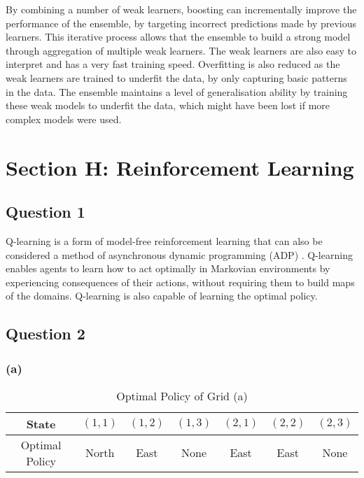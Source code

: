 \documentclass[10pt]{article}
\begin{document}
By combining a number of weak learners, boosting can incrementally improve the performance of
the ensemble, by targeting incorrect predictions made by previous learners. This iterative process
allows that the ensemble to build a strong model through aggregation of multiple weak learners.
The weak learners are also easy to interpret and has a very fast training speed. Overfitting is also
reduced as the weak learners are trained to underfit the data, by only capturing basic patterns in the data.
The ensemble maintains a level of generalisation ability by training these weak models to underfit the data, which
might have been lost if more complex models were used.

\section*{Section H: Reinforcement Learning}

\subsection*{Question 1}

Q-learning is a form of model-free reinforcement learning that can also be considered a method of
asynchronous dynamic programming (ADP) \cite{watkins1989learning}. Q-learning enables agents to
learn how to act optimally in Markovian environments by experiencing consequences of their actions,
without requiring them to build maps of the domains. Q-learning is also capable of learning the
optimal policy.

\subsection*{Question 2}

\subsubsection*{(a)}

\begin{table*}
    \centering
    \caption{Optimal Policy of Grid (a)}
    \begin{tabular}{|c|c|c|c|c|c|c|}
        \hline
        State & $(1,1)$ & $(1,2)$ & $(1,3)$ & $(2,1)$ & $(2,2)$ & $(2,3)$ \\
        \hline
        Optimal Policy & North & East & None & East & East & None \\
        \hline
    \end{tabular}    
\end{table*}
\end{document}
